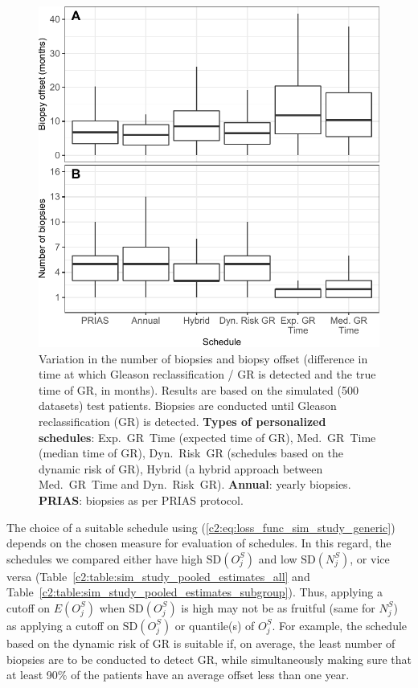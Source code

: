\begin{figure}
\includegraphics{contents/c2/images/c2_fig4.pdf}
\caption{Variation in the number of biopsies and biopsy offset (difference in time at which Gleason reclassification / GR is detected and the true time of GR, in months). Results are based on the simulated (500 datasets) test patients. Biopsies are conducted until Gleason reclassification (GR) is detected. \textbf{Types of personalized schedules}: Exp.~GR~Time (expected time of GR), Med.~GR~Time (median time of GR), Dyn.~Risk~GR (schedules based on the dynamic risk of GR), Hybrid (a hybrid approach between Med.~GR~Time and Dyn.~Risk~GR). \textbf{Annual}: yearly biopsies. \textbf{PRIAS}: biopsies as per PRIAS protocol.}
\label{c2:fig:4}
\end{figure}

The choice of a suitable schedule using (\ref{c2:eq:loss_func_sim_study_generic}) depends on the chosen measure for evaluation of schedules. In this regard, the schedules we compared either have high $\mbox{SD}(O^S_j)$ and low $\mbox{SD}(N^S_j)$, or vice versa (Table~\ref{c2:table:sim_study_pooled_estimates_all} and Table~\ref{c2:table:sim_study_pooled_estimates_subgroup}). Thus, applying a cutoff on $E(O^S_j)$ when $\mbox{SD}(O^S_j)$ is high may not be as fruitful (same for $N^S_j$) as applying a cutoff on $\mbox{SD}(O^S_j)$ or quantile(s) of $O^S_j$. For example, the schedule based on the dynamic risk of GR is suitable if, on average, the least number of biopsies are to be conducted to detect GR, while simultaneously making sure that at least 90\% of the patients have an average offset less than one year.
